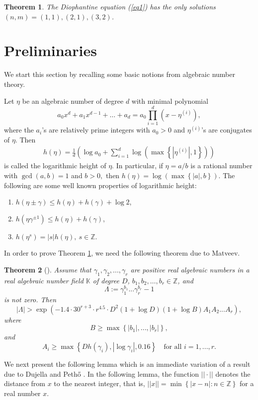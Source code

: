 \documentclass[10pt,a4paper]{amsart}
\newtheorem{theorem}{Theorem}[section]
\begin{document}
\begin{theorem}\label{Thm1}
The Diophantine equation (\ref{eq1}) has the only  solutions $(n,m)=(1,1),(2,1),(3,2)$.
\end{theorem}

\section{Preliminaries}
We start this section by recalling some basic notions from algebraic number theory.

Let $\eta $ be an algebraic number of degree $d$ with minimal polynomial 
$$a_{0}x^{d}+a_{1}x^{d-1}+\ldots+a_{d}=a_{0}\prod\limits_{i=1}^{d}\left(x-\eta
^{(i)}\right), $$
where the $a_{i}$'s are relatively prime integers with $a_{0}>0$ and $\eta
^{(i)}$'s are conjugates of $\eta $. Then 
\begin{align*}
  h(\eta )=\frac{1}{d}\left( \log a_{0}+\sum\limits_{i=1}^{d}\log \left( \max
\left\{ |\eta ^{(i)}|,1\right\} \right) \right)  
\end{align*}
is called the logarithmic height of $\eta .$ In particular, if $\eta =a/b$
is a rational number with $\gcd (a,b)=1$ and $b>0,$ then $h(\eta )=\log
\left( \max \left\{ |a|,b\right\} \right)$. The following are some well known properties of logarithmic height:
\begin{enumerate}
    \item[\upshape(1)] $h(\eta \pm \gamma )\leq h(\eta )+h(\gamma )+\log 2$,
    \item[\upshape(2)] $h(\eta \gamma ^{\pm 1})\leq h(\eta )+h(\gamma )$,
    \item[\upshape(3)]$h(\eta ^{s})=|s|h(\eta ),~s\in \mathbb{Z}$. 
\end{enumerate}
In order to prove Theorem \ref{Thm1}, we need the following theorem due to Matveev. 
\begin{theorem}[\cite{r13}]\label{Thm2}
Assume that $\gamma _{1},\gamma _{2},...,\gamma _{r}$ are
positive real algebraic numbers in a real algebraic number field $\mathbb{K}$
of degree $D$, $b_{1},b_{2},\ldots,b_{r}\in \mathbb{Z}$, and 
$$
\Lambda :=\gamma _{1}^{b_{1}}...\gamma _{r}^{b_{r}}-1 $$
is not zero. Then 
$$
|\Lambda |>\exp \left( -1.4\cdot 30^{r+3}\cdot r^{4.5}\cdot D^{2}(1+\log
D)(1+\log B)A_{1}A_{2}...A_{r}\right), $$
where 
$$
B\geq \max \left\{ |b_{1}|,...,|b_{r}|\right\}, 
$$
and 
$$A_{i}\geq \max \left\{ Dh(\gamma _{i}),|\log \gamma _{i}|,0.16\right\}\quad \text{for all } i=1,...,r. $$

\end{theorem}
We next present the following lemma which is an immediate variation of a result due to Dujella and Peth{\H{o}} \cite{r7}. In the following lemma, the function $||\cdot ||$ denotes the
distance from $x$ to the nearest integer, that is, $||x||=\min \left\{
|x-n|:n\in\mathbb{Z}\right\} $ for a real number $x.$
\end{document}
